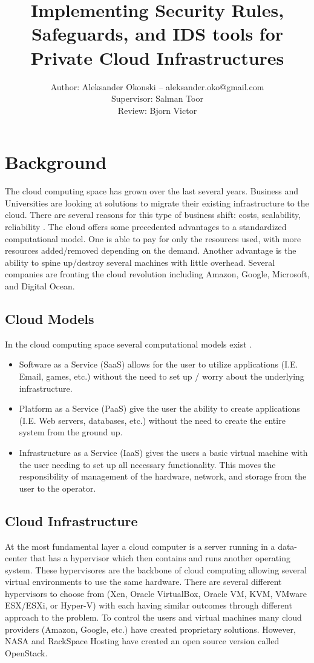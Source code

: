 \documentclass[12pt]{article}
\title{Implementing Security Rules, Safeguards, and IDS tools for Private Cloud Infrastructures}
\author{Author: Aleksander Okonski -- aleksander.oko@gmail.com \\ Supervisor: Salman Toor \\ Review: Bjorn Victor }
\date{}
\begin{document}
\maketitle
\newpage
\tableofcontents
\newpage

\section{Background}
The cloud computing space has grown over the last several years. Business and Universities are looking at solutions to migrate their existing infrastructure to the cloud. There are several reasons for this type of business shift: costs, scalability, reliability \cite{DillonWuChang}. The cloud offers some precedented advantages to a standardized computational model. One is able to pay for only the resources used, with more resources added/removed depending on the demand. Another advantage is the ability to spine up/destroy several machines with little overhead. Several companies are fronting the cloud revolution including Amazon, Google, Microsoft, and Digital Ocean.

\subsection{Cloud Models}
In the cloud computing space several computational models exist \cite{wikipedia}.

\begin{itemize}
    \item Software as a Service (SaaS) allows for the user to utilize applications (I.E. Email, games, etc.) without the need to set up / worry about the underlying infrastructure.
    \item Platform as a Service (PaaS) give the user the ability to create applications (I.E. Web servers, databases, etc.) without the need to create the entire system from the ground up.
    \item Infrastructure as a Service (IaaS) gives the users a basic virtual machine with the user needing to set up all necessary functionality. This moves the responsibility of management of the hardware, network, and storage from the user to the operator.
\end{itemize}

\subsection{Cloud Infrastructure}
At the most fundamental layer a cloud computer is a server running in a data-center that has a hypervisor which then contains and runs another operating system. These hypervisores are the backbone of cloud computing allowing several virtual environments to use the same hardware. There are several different hypervisors to choose from (Xen, Oracle VirtualBox, Oracle VM, KVM, VMware ESX/ESXi, or Hyper-V) with each having similar outcomes through different approach to the problem. To control the users and virtual machines many cloud providers (Amazon, Google, etc.) have created proprietary solutions. However, NASA and RackSpace Hosting \cite{wikipedia1} have created an open source version called OpenStack.
\end{document}
